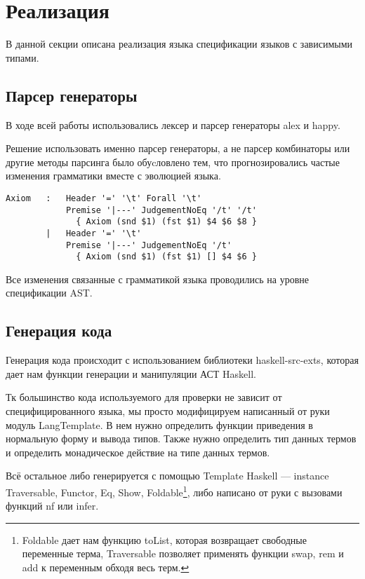 \section{Реализация}
В данной секции описана реализация языка спецификации языков с зависимыми типами.

\subsection{Парсер генераторы}
В ходе всей работы использовались лексер и парсер генераторы alex\cite{alex} и happy\cite{happy}.

Решение использовать именно парсер генераторы, а не парсер комбинаторы\cite{parsec} или другие методы парсинга было обуcловлено тем, что прогнозировались частые изменения грамматики вместе с эволюцией языка.

\begin{lstlisting}[caption={Часть спецификации парсера},captionpos=b]
Axiom   :   Header '=' '\t' Forall '\t'
            Premise '|---' JudgementNoEq '/t' '/t'
              { Axiom (snd $1) (fst $1) $4 $6 $8 }
        |   Header '=' '\t'
            Premise '|---' JudgementNoEq '/t'
              { Axiom (snd $1) (fst $1) [] $4 $6 }
\end{lstlisting}

Все изменения связанные с грамматикой языка проводились на уровне спецификации AST.






\subsection{Генерация кода}
Генерация кода происходит с использованием библиотеки haskell-src-exts\cite{src_exts}, которая дает нам функции генерации и манипуляции АСТ Haskell.

Тк большинство кода используемого для проверки не зависит от специфицированного языка, мы просто модифицируем написанный от руки модуль LangTemplate. В нем нужно определить функции приведения в нормальную форму и вывода типов. Также нужно определить тип данных термов и определить монадическое действие на типе данных термов.

Всё остальное либо генерируется с помощью Template Haskell\cite{TH} --- instance Traversable, Functor, Eq, Show, Foldable\footnote{Foldable дает нам функцию toList, которая возвращает свободные переменные терма, Traversable позволяет применять функции swap, rem и add  к переменным обходя весь терм.}, либо написано от руки с вызовами функций nf или infer.


